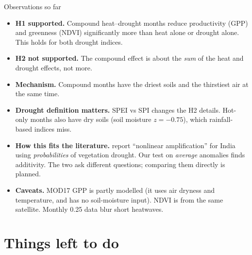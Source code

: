 \documentclass[11pt,aspectratio=169]{beamer}
\begin{document}
\begin{frame}{Observations so far}
  \small
  \begin{itemize}
    \item \textbf{H1 supported.} Compound heat--drought months reduce
      productivity (GPP) and greenness (NDVI) significantly more than heat
      alone or drought alone. This holds for both drought indices.
    \item \textbf{H2 not supported.} The compound effect is about the
      \emph{sum} of the heat and drought effects, not more.
    \item \textbf{Mechanism.} Compound months have the driest soils and the
      thirstiest air at the same time.
    \item \textbf{Drought definition matters.} SPEI vs SPI changes the H2
      details. Hot-only months also have dry soils (soil moisture
      $z = -0.75$), which rainfall-based indices miss.
    \item \textbf{How this fits the literature.} \citet{meena2026} report
      ``nonlinear amplification'' for India using \emph{probabilities} of
      vegetation drought. Our test on \emph{average} anomalies finds
      additivity. The two ask different questions; comparing them directly
      is planned.
    \item \textbf{Caveats.} MOD17 GPP is partly modelled (it uses air
      dryness and temperature, and has no soil-moisture input). NDVI is from
      the same satellite. Monthly 0.25\textdegree{} data blur short
      heatwaves.
  \end{itemize}
\end{frame}

\section{Things left to do}
\end{document}
